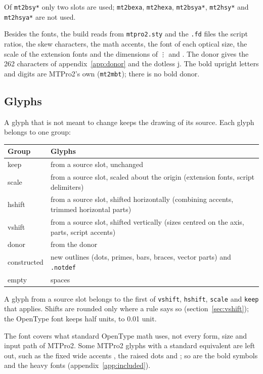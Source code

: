 \documentclass[10pt]{article}
\newcommand\file[1]{\texttt{#1}}
\newcommand\code[1]{\texttt{#1}}
\begin{document}
Of \file{mt2bsy*} only two slots are used; \file{mt2bexa}, \file{mt2hexa},
\file{mt2bsya*}, \file{mt2hsy*} and \file{mt2hsya*} are not used.

Besides the fonts, the build reads from \file{mtpro2.sty} and the
\file{.fd} files the script ratios, the skew characters, the math
accents, the font of each optical size, the scale of the extension fonts
and the dimensions of \code{\string\vdots} and \code{\string\ddots}.
The donor gives the 262 characters of appendix~\ref{app:donor} and the
dotless j.  The bold upright letters and digits are MTPro2's own
(\file{mt2mbt}); there is no bold donor.

\subsection{Glyphs}\label{sec:groups}

A glyph that is not meant to change keeps the drawing of its source.
Each glyph belongs to one group:

\begin{center}
\begin{tabularx}{\textwidth}{>{\ttfamily}lX}
\toprule
\normalfont Group & Glyphs \\
\midrule
keep & from a source slot, unchanged \\
scale & from a source slot, scaled about the origin (extension fonts,
  script delimiters) \\
hshift & from a source slot, shifted horizontally (combining accents,
  trimmed horizontal parts) \\
vshift & from a source slot, shifted vertically (sizes centred on the
  axis, parts, script accents) \\
donor & from the donor \\
constructed & new outlines (dots, primes, bars, braces, vector parts)
  and \code{.notdef} \\
empty & spaces \\
\bottomrule
\end{tabularx}
\end{center}

A glyph from a source slot belongs to the first of \code{vshift},
\code{hshift}, \code{scale} and \code{keep} that applies.  Shifts are
rounded only where a rule says so (section~\ref{sec:vshift}); the
OpenType font keeps half units, to 0.01 unit.

The font covers what standard OpenType math uses, not every form, size
and input path of MTPro2.  Some MTPro2 glyphs with a standard
equivalent are left out, such as the fixed wide accents
\code{\string\what}, the raised dots \code{\string\dotup} and
\code{\string\smallint}; so are the bold symbols and the heavy fonts
(appendix~\ref{app:included}).
\end{document}
